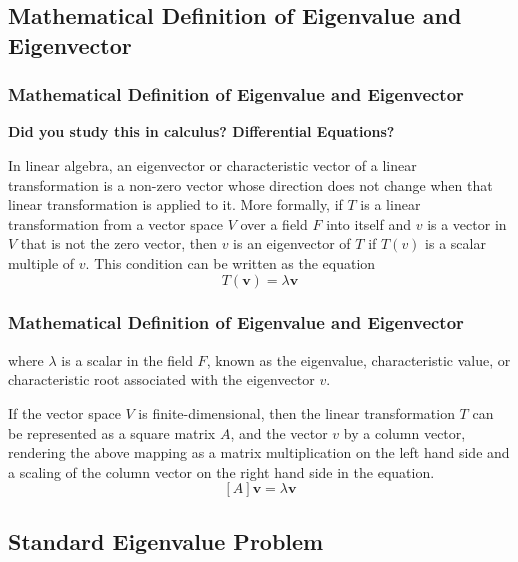 \documentclass[fleqn]{ltx-talk} %
\newcommand{\sectionIsubsectionItitle}{Mathematical Definition of Eigenvalue and Eigenvector}
\newcommand{\sectionIsubsectionIItitle}{Standard Eigenvalue Problem}
\begin{document}
		\subsection{\sectionIsubsectionItitle}\label{sectionIsubsectionI}

			\begin{frame}
				\frametitle{\sectionIsubsectionItitle}
				\bigskip

				\textbf{Did you study this in calculus? Differential Equations?} \vspace{3mm}

				In linear algebra, an eigenvector or characteristic vector of a linear transformation is a non-zero vector whose direction does not change when that linear transformation is applied to it. More formally, if $T$ is a linear transformation from a vector space $V$ over a field $F$ into itself and $v$ is a vector in $V$ that is not the zero vector, then $v$ is an eigenvector of $T$ if $T(v)$ is a scalar multiple of $v$. This condition can be written as the equation\\

				\[ T(\bm{v})=\lambda \bm{v} \]


				\btVFill
			\end{frame}

			\begin{frame}
				\frametitle{\sectionIsubsectionItitle}
				\bigskip

				where $\lambda$ is a scalar in the field $F$, known as the eigenvalue, characteristic value, or characteristic root associated with the eigenvector $v$.

				If the vector space $V$ is finite-dimensional, then the linear transformation $T$ can be represented as a square matrix $A$, and the vector $v$ by a column vector, rendering the above mapping as a matrix multiplication on the left hand side and a scaling of the column vector on the right hand side in the equation.\\

				\[ [A]\bm{v}=\lambda \bm{v} \]

				\btVFill
			\end{frame}

		\subsection{\sectionIsubsectionIItitle}\label{sectionIsubsectionII}
\end{document}
